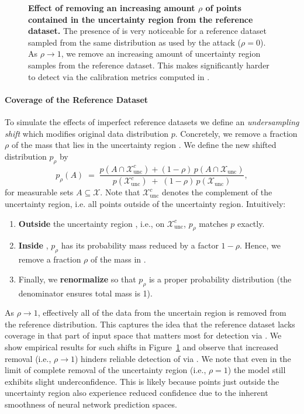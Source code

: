 \begin{figure}[t]
\caption[\textbf{Effect of removing an increasing amount $\rho$ of points contained in the uncertainty region from the reference dataset.}]{\textbf{Effect of removing an increasing amount $\rho$ of points contained in the uncertainty region from the reference dataset.} The presence of \attack is very noticeable for a reference dataset sampled from the same distribution as used by the attack ($\rho = 0$). As $\rho \rightarrow 1$, we remove an increasing amount of uncertainty region samples from the reference dataset. This makes \attack significantly harder to detect via the calibration metrics computed in \name.}
\label{fig:ref_abl}
\end{figure}


\paragraph{Coverage of the Reference Dataset} 

To simulate the effects of imperfect reference datasets we define an \textit{undersampling shift} which modifies original data distribution \(p\). Concretely, we remove a fraction \(\rho\) of the mass that lies in the uncertainty region \uncertreg. We define the new shifted distribution \(p_{\rho}\) by
\[
p_{\rho}(A) \;=\; \frac{p(A \cap \mathcal{X}_\text{unc}^{c}) + (1-\rho)\, p(A \cap \mathcal{X}_\text{unc})}%
                       {p(\mathcal{X}_\text{unc}^{c}) \;+\; (1-\rho)\, p(\mathcal{X}_\text{unc})},
\]
for measurable sets \(A \subseteq \mathcal{X}\). Note that $\mathcal{X}_\text{unc}^c$ denotes the complement of the uncertainty region, i.e. all points outside of the uncertainty region. Intuitively:
\begin{enumerate}
    \item \textbf{Outside} the uncertainty region \uncertreg, i.e., on $\mathcal{X}_\text{unc}^c$, \(p_{\rho}\) matches \(p\) exactly.
    \item \textbf{Inside} \uncertreg, \(p_{\rho}\) has its probability mass reduced by a factor \(1-\rho\). Hence, we remove a fraction \(\rho\) of the mass in \uncertreg.
    \item Finally, we \textbf{renormalize} so that \(p_{\rho}\) is a proper probability distribution (the denominator ensures total mass is 1).
\end{enumerate}

As \(\rho \to 1\), effectively all of the data from the uncertain region is removed from the reference distribution. This captures the idea that the reference dataset lacks coverage in that part of input space that matters most for detection via \name. We show empirical results for such shifts in Figure~\ref{fig:ref_abl} and observe that increased removal (i.e., $\rho \rightarrow 1$) hinders reliable detection of \attack via \name. We note that even in the limit of complete removal of the uncertainty region (i.e., $\rho = 1$) the model still exhibits slight underconfidence. This is likely because points just outside the uncertainty region also experience reduced confidence due to the inherent smoothness of neural network prediction spaces.

